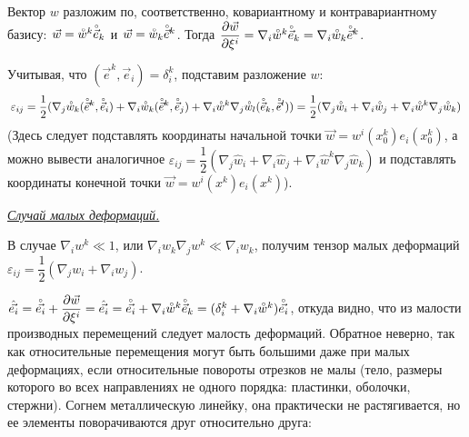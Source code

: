 Вектор $w$ разложим по, соответственно, ковариантному и контравариантному базису:
$\vec w = \accentset{\circ}{w}^k\accentset{\circ}{\vec e}_k$  и $\vec w = \accentset{\circ}{ w}_k\accentset{\circ}{\vec e}^k$. Тогда $\dfrac{\partial\vec w}{\partial\xi^i} = \nabla_i\accentset{\circ}{w}^k\accentset{\circ}{\vec e}_k = \nabla_i\accentset{\circ}{w}_k\accentset{\circ}{\vec e}^k$.

Учитывая, что $(\vec e^k,\vec e_i) = \delta_i^k$, подставим разложение $w$:
$$
  \varepsilon_{ij} = \dfrac{1}{2}(\nabla_j\accentset{\circ}{w}_k(\accentset{\circ}{\vec e}^k, \accentset{\circ}{\vec e}_i) + \nabla_i\accentset{\circ}{w}_k(\accentset{\circ}{\vec e}^k, \accentset{\circ}{\vec e}_j) + \nabla_i\accentset{\circ}{w}^k \nabla_j\accentset{\circ}{w}_l(\accentset{\circ}{\vec e}_k, \accentset{\circ}{\vec e}^l)) = \dfrac{1}{2}(\nabla_j\accentset{\circ}{w}_i + \nabla_i\accentset{\circ}{w}_j +
  \nabla_i\accentset{\circ}{w}^k \nabla_j\accentset{\circ}{w}_k)
$$
(Здесь следует подставлять координаты начальной точки $\vec w = w^i(x_0^k)e_i(x_0^k)$, а можно вывести аналогичное $\varepsilon_{ij} = \dfrac{1}{2}(\nabla_j\hat {w}_i + \nabla_i\hat {w}_j +
  \nabla_i\hat {w}^k \nabla_j\hat {w}_k)$ и подставлять координаты конечной точки $\vec w = w^i(x^k)e_i(x^k)$).

\begin{center}
  \textit{\underline{Случай малых деформаций.}}
\end{center}

В случае $\nabla_i {w}^k \ll 1$, или $\nabla_i {w}_k\nabla_j {w}^k \ll \nabla_i {w}_k$, получим тензор малых деформаций $\varepsilon_{ij} = \dfrac{1}{2}(\nabla_j {w}_i + \nabla_i {w}_j)$.

$\hat{\vec{e_i}} = \accentset{\circ}{\vec{e_i}} +\dfrac{\partial\vec w}{\partial\xi^i} = \hat{\vec{e_i}} = \accentset{\circ}{\vec{e_i}} +\nabla_i\accentset{\circ}{w}^k\accentset{\circ}{\vec e}_k = (\delta_i^k + \nabla_i\accentset{\circ}{w}^k)\accentset{\circ}{\vec{e_i}}$, откуда видно, что из малости производных перемещений следует малость деформаций. Обратное неверно, так как относительные перемещения могут быть большими даже при малых деформациях, если относительные повороты отрезков не малы (тело, размеры которого во всех направлениях не одного порядка: пластинки, оболочки, стержни). Согнем металлическую линейку, она практически не растягивается, но ее элементы поворачиваются друг относительно друга:
\begin{figure}[H]
  \centering{}
  \label{fig2}
\end{figure}

